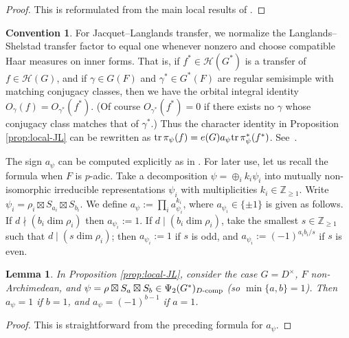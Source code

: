 \documentclass[11pt,reqno]{amsart}
\theoremstyle{plain}
\newtheorem{lem}[thm]{Lemma}
\theoremstyle{definition}
\newtheorem{conv}[thm]{Convention}
\newcommand{\Z}{\mathbb{Z}}
\newcommand{\tr}{\tu{tr}\,}
\newcommand{\tu}{\textup}
\numberwithin{equation}{subsection}
\begin{document}
\begin{proof}
This is reformulated from the main local results of \cite{Bad,BadRen}.
\end{proof}

\begin{conv}\label{convention:transfer-factor}
For Jacquet--Langlands transfer, we normalize the
Langlands--Shelstad transfer factor to equal one whenever nonzero
and choose compatible Haar measures on inner forms. That is, if $f^*\in \mathcal{H}(G^*)$ is a transfer of $f\in \mathcal{H}(G)$, and if $\gamma\in G(F)$ and $\gamma^*\in G^*(F)$ are regular semisimple with matching conjugacy classes, then we have the orbital integral identity $O_{\gamma}(f)=O_{\gamma^*}(f^*)$. (Of course $O_{\gamma^*}(f^*)=0$ if there exists no $\gamma$ whose conjugacy class matches that of $\gamma^*$.) Thus the character identity in Proposition \ref{prop:local-JL} can be rewritten as 
$\tr \pi_\psi(f)=e(G)a_{\psi} \tr \pi^*_\psi(f^*)$. See~\cite[Thm.~1.6.4]{KMSW}.
\end{conv}

The sign $a_{\psi}$ can be computed explicitly as in \cite[\S1.6.3]{KMSW}. For later use, let us recall the formula when $F$ is $p$-adic. Take a decomposition $\psi=\oplus_i k_i \psi_i$ into mutually non-isomorphic irreducible representations $\psi_i$ with multiplicities $k_i\in \Z_{\ge1}$. Write $\psi_i=\rho_i\boxtimes S_{a_i}\boxtimes S_{b_i}$. We define $a_{\psi}:=\prod_i a_{\psi_i}^{k_i}$, where $a_{\psi_i}\in \{\pm1\}$ is given as follows. If $d\nmid(b_i \dim \rho_i)$ then $a_{\psi_i}:=1$. If $d \mid (b_i \dim \rho_i)$, take the smallest $s\in \Z_{\ge1}$ such that $d\mid (s \dim \rho_i)$; then $a_{\psi_i}:=1$ if $s$ is odd, and $a_{\psi_i}:=(-1)^{a_i b_i/s}$ if $s$ is even.

\begin{lem}\label{lem:a-psi}
In Proposition \ref{prop:local-JL}, consider the case $G=D^\times$, $F$ non-Archimedean, and $\psi=\rho\boxtimes S_a\boxtimes S_b\in \Psi_2(G^*)_{D\tu{-comp}}$ (so $\min\{a,b\} = 1$). Then $a_\psi=1$ if $b=1$, and $a_{\psi}=(-1)^{b-1}$ if $a=1$.
\end{lem}

\begin{proof}
This is straightforward from the preceding formula for $a_{\psi}$.
\end{proof}
\end{document}

